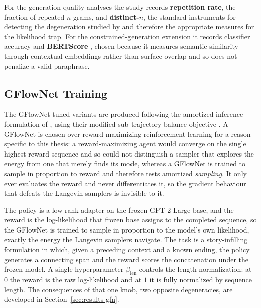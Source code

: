 
For the generation-quality analyses the study records \textbf{repetition rate}, the fraction of repeated $n$-grams, and \textbf{distinct-$n$}, the standard instruments for detecting the degeneration studied by \citet{holtzman2020curious} and therefore the appropriate measures for the likelihood trap. For the constrained-generation extension it records classifier accuracy and \textbf{BERTScore} \citep{zhang2020bertscore}, chosen because it measures semantic similarity through contextual embeddings rather than surface overlap and so does not penalize a valid paraphrase.

\subsection{GFlowNet Training}
\label{sec:meth-gfn}

The GFlowNet-tuned variants are produced following the amortized-inference formulation of \citet{hu2024amortizing}, using their modified sub-trajectory-balance objective \citep{malkin2022trajectory, madan2023learning}. A GFlowNet is chosen over reward-maximizing reinforcement learning for a reason specific to this thesis: a reward-maximizing agent would converge on the single highest-reward sequence and so could not distinguish a sampler that explores the energy from one that merely finds its mode, whereas a GFlowNet is trained to sample in proportion to reward and therefore tests amortized \emph{sampling}. It only ever evaluates the reward and never differentiates it, so the gradient behaviour that defeats the Langevin samplers is invisible to it.

The policy is a low-rank adapter \citep{hu2022lora} on the frozen GPT-2 Large base, and the reward is the log-likelihood that frozen base assigns to the completed sequence, so the GFlowNet is trained to sample in proportion to the model's own likelihood, exactly the energy the Langevin samplers navigate. The task is a story-infilling formulation in which, given a preceding context and a known ending, the policy generates a connecting span and the reward scores the concatenation under the frozen model. A single hyperparameter $\beta_{\text{len}}$ controls the length normalization: at $0$ the reward is the raw log-likelihood and at $1$ it is fully normalized by sequence length. The consequences of that one knob, two opposite degeneracies, are developed in Section~\ref{sec:results-gfn}.


